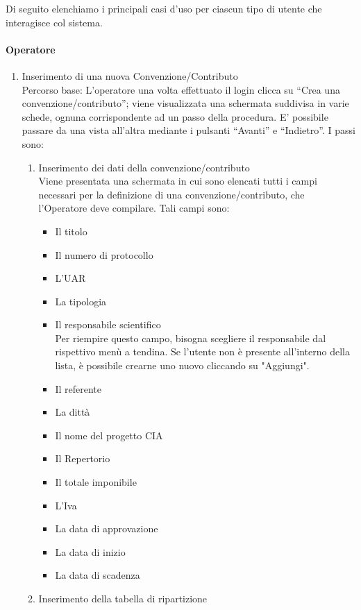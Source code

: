 Di seguito elenchiamo i principali casi d'uso per ciascun tipo di utente che interagisce col sistema.
\paragraph{Operatore}
\begin{enumerate}
  \item Inserimento di una nuova Convenzione/Contributo\\
  
  Percorso base:
  L'operatore una volta effettuato il login clicca su ``Crea una convenzione/contributo''; viene visualizzata una schermata suddivisa in varie schede,
  ognuna corrispondente ad un passo della procedura. E' possibile passare da una vista all'altra mediante i pulsanti ``Avanti'' e ``Indietro''. I passi sono:
  \begin{enumerate}
    \item Inserimento dei dati della convenzione/contributo\\
      
      Viene presentata una schermata in cui sono elencati tutti i campi necessari per la definizione di una convenzione/contributo, 
      che l'Operatore deve compilare. Tali campi sono:
      \begin{itemize}
	\item Il titolo
	\item Il numero di protocollo
	\item L'UAR
	\item La tipologia
	\item Il responsabile scientifico\\
	  Per riempire questo campo, bisogna scegliere il responsabile dal rispettivo menù a tendina. 
	  Se l'utente non è presente all'interno della lista, è possibile crearne uno nuovo cliccando su "Aggiungi".
	\item Il referente
	\item La dittà
	\item Il nome del progetto CIA
	\item Il Repertorio
	\item Il totale imponibile
	\item L'Iva
	\item La data di approvazione
	\item La data di inizio
	\item La data di scadenza
      \end{itemize}
      
    \item Inserimento della tabella di ripartizione\\
     

\end{enumerate}
\end{enumerate}
